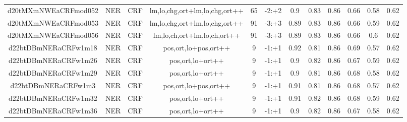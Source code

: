\documentclass[a4paper]{article}
\begin{document}
\begin{landscape}
\begin{center}
\begin{tabular}{ |c|c|c|c|c|c|c|c|c|c|c|c|}
 	

 
 	
 	\small{ d20tMXmNWEaCRFmod052 } & \small{ NER} & \small{  CRF }  & lm,lo,chg,ort+lm,lo,chg,ort++  &  65 &  \small{  -2:+2 }  &  0.9 & 0.83 & 0.86  &  0.66 & 0.58 & 0.62 \\
 	

 
 	
 	\small{ d20tMXmNWEaCRFmod053 } & \small{ NER} & \small{  CRF }  & lm,lo,chg,ort+lm,lo,chg,ort++  &  91 &  \small{  -3:+3 }  &  0.89 & 0.83 & 0.86  &  0.66 & 0.59 & 0.62 \\
 	

 
 	
 	\small{ d20tMXmNWEaCRFmod056 } & \small{ NER} & \small{  CRF }  & lm,lo,ch,ort+lm,lo,ch,ort++  &  91 &  \small{  -3:+3 }  &  0.89 & 0.83 & 0.86  &  0.66 & 0.6 & 0.62 \\
 	

 
 	
 	\small{ d22btDBmNERaCRFw1m18 } & \small{ NER} & \small{  CRF }  & pos,ort,lo+pos,ort++  &  9 &  \small{  -1:+1 }  &  0.92 & 0.81 & 0.86  &  0.69 & 0.57 & 0.62 \\
 	

 
 	
 	\small{ d22btDBmNERaCRFw1m26 } & \small{ NER} & \small{  CRF }  & pos,ort,lo+ort++  &  9 &  \small{  -1:+1 }  &  0.9 & 0.82 & 0.86  &  0.67 & 0.59 & 0.62 \\
 	

 
 	
 	\small{ d22btDBmNERaCRFw1m29 } & \small{ NER} & \small{  CRF }  & pos,ort,lo+ort++  &  9 &  \small{  -1:+1 }  &  0.9 & 0.81 & 0.86  &  0.68 & 0.58 & 0.62 \\
 	

 
 	
 	\small{ d22btDBmNERaCRFw1m3 } & \small{ NER} & \small{  CRF }  & pos,ort,lo+pos,ort++  &  9 &  \small{  -1:+1 }  &  0.91 & 0.81 & 0.86  &  0.68 & 0.57 & 0.62 \\
 	

 
 	
 	\small{ d22btDBmNERaCRFw1m32 } & \small{ NER} & \small{  CRF }  & pos,ort,lo+ort++  &  9 &  \small{  -1:+1 }  &  0.91 & 0.82 & 0.86  &  0.68 & 0.59 & 0.62 \\
 	

 
 	
 	\small{ d22btDBmNERaCRFw1m36 } & \small{ NER} & \small{  CRF }  & pos,ort,lo+ort++  &  9 &  \small{  -1:+1 }  &  0.9 & 0.82 & 0.86  &  0.67 & 0.58 & 0.62 \\
 	


\end{tabular}
\end{center}
\end{landscape}
\end{document}
